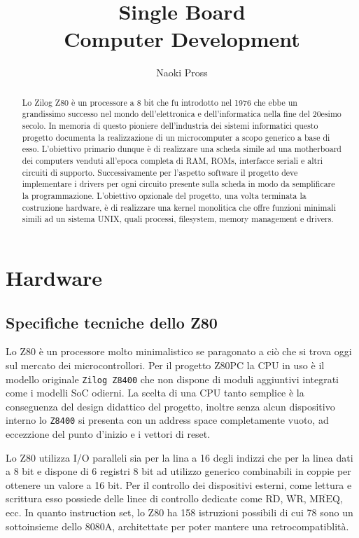 \documentclass[a4paper, 11pt]{article}
\title{\prj Single Board \\ Computer Development }
\author{Naoki Pross}
\newcommand{\prj}{Z80\textmu PC\xspace}
\newcommand{\inv}[1]{$\overline{\mbox{#1}}$}
\begin{document}
\maketitle
\begin{abstract}

    Lo Zilog Z80 \`e un processore a 8 bit che fu introdotto nel 1976 che ebbe
    un grandissimo successo nel mondo dell'elettronica e dell'informatica
    nella fine del 20esimo secolo. In memoria di questo pioniere
    dell'industria dei sistemi informatici questo progetto documenta la
    realizzazione di un microcomputer a scopo generico a base di esso.
    L'obiettivo primario dunque \`e di realizzare una scheda simile ad una
    motherboard dei computers venduti all'epoca completa di RAM, ROMs,
    interfacce seriali e altri circuiti di supporto. Successivamente per
    l'aspetto software il progetto deve implementare i drivers per ogni
    circuito presente sulla scheda in modo da semplificare la programmazione. 
    L'obiettivo opzionale del progetto, una volta terminata la costruzione
    hardware, \`e di realizzare una kernel monolitica che offre funzioni
    minimali simili ad un sistema UNIX, quali processi, filesystem, memory
    management e drivers.

\end{abstract}

\section{Hardware}

\subsection{Specifiche tecniche dello Z80}

Lo Z80 \`e un processore molto minimalistico se paragonato a ci\`o che si
trova oggi sul mercato dei microcontrollori. Per il progetto \prj la CPU in
uso \`e il modello originale \texttt{Zilog Z8400} che non dispone di moduli
aggiuntivi integrati come i modelli SoC odierni. La scelta di una CPU tanto
semplice \`e la conseguenza del design didattico del progetto, inoltre senza
alcun dispositivo interno lo \texttt{Z8400} si presenta con un address space 
completamente vuoto, ad eccezzione del punto d'inizio e i vettori di reset.

Lo Z80 utilizza I/O paralleli sia per la lina a 16 degli indizzi che per la
linea dati a 8 bit e dispone di 6 registri 8 bit ad utilizzo generico
combinabili in coppie per ottenere un valore a 16 bit. Per il controllo dei
dispositivi esterni, come lettura e scrittura esso possiede delle linee di
controllo dedicate come {\tt\inv{RD}}, {\tt\inv{WR}}, {\tt\inv{MREQ}}, ecc. In
quanto instruction set, lo Z80 ha 158 istruzioni possibili di cui 78 sono un
sottoinsieme dello 8080A, architettate per poter mantere una
retrocompatiblit\`a.
\end{document}
